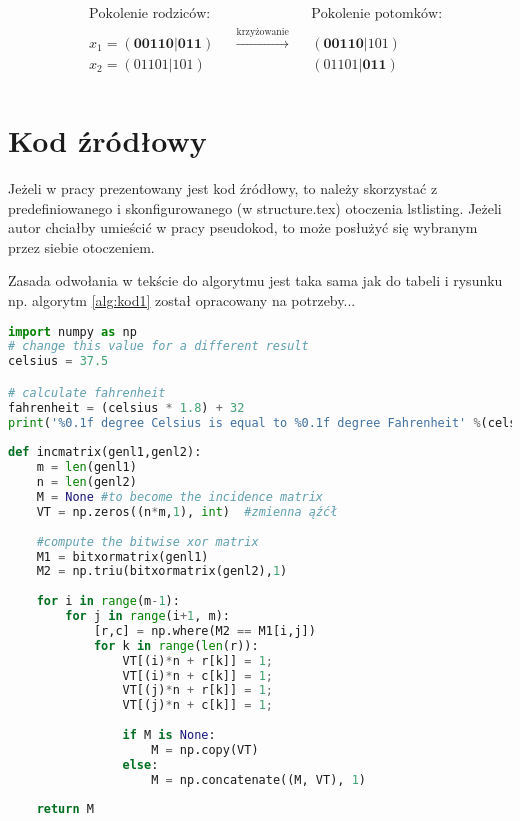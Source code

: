 \begin{example}
\begin{align*}
&\text{Pokolenie rodziców:} & & & &\text{Pokolenie potomków:} \\
&x_1 = (\textbf{00110} | \textbf{011}) & &\xrightarrow{\text{krzyżowanie}} & &(\textbf{00110}|1 0 1)\\
&x_2 = (0 1 1 0 1 | 1 0 1) & & & &(0 1 1 0 1|\textbf{011})\\
\end{align*}
\end{example}



\section{Kod źródłowy}

Jeżeli w pracy prezentowany jest kod źródłowy, to należy skorzystać z predefiniowanego i skonfigurowanego (w structure.tex) otoczenia lstlisting. Jeżeli autor chciałby umieścić w pracy pseudokod, to może posłużyć się wybranym przez siebie otoczeniem.

Zasada odwołania w tekście do algorytmu jest taka sama jak do tabeli i rysunku np. algorytm \ref{alg:kod1} został opracowany na potrzeby...

\begin{lstlisting}[language=Python, caption=Fragment algorytmu xxx, label=alg:kod1]
import numpy as np
# change this value for a different result
celsius = 37.5

# calculate fahrenheit
fahrenheit = (celsius * 1.8) + 32
print('%0.1f degree Celsius is equal to %0.1f degree Fahrenheit' %(celsius,fahrenheit))
 
def incmatrix(genl1,genl2):
    m = len(genl1)
    n = len(genl2)
    M = None #to become the incidence matrix
    VT = np.zeros((n*m,1), int)  #zmienna ąźćł
 
    #compute the bitwise xor matrix
    M1 = bitxormatrix(genl1)
    M2 = np.triu(bitxormatrix(genl2),1) 
 
    for i in range(m-1):
        for j in range(i+1, m):
            [r,c] = np.where(M2 == M1[i,j])
            for k in range(len(r)):
                VT[(i)*n + r[k]] = 1;
                VT[(i)*n + c[k]] = 1;
                VT[(j)*n + r[k]] = 1;
                VT[(j)*n + c[k]] = 1;
 
                if M is None:
                    M = np.copy(VT)
                else:
                    M = np.concatenate((M, VT), 1)
 
    return M
\end{lstlisting}
